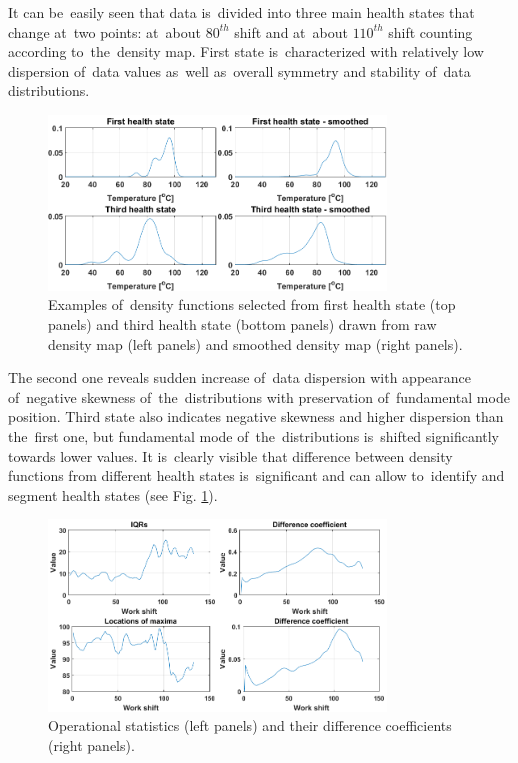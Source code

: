 It can be~easily seen that data is~divided into three main health states that change at~two points: at~about $80^{th}$ shift and at~about $110^{th}$ shift counting according to~the~density map. First state is~characterized with relatively low dispersion of~data values as~well as~overall symmetry and stability of~data distributions. 

\begin{figure}[ht!]
\centering
\includegraphics[width = 0.8\textwidth]{wykresy/ks_ex.png}
\caption{Examples of~density functions selected from first health state (top panels) and third health state (bottom panels) drawn from raw density map (left panels) and smoothed density map (right panels).}
\label{fig: ks_ex}
\end{figure}

The second one reveals sudden increase of~data dispersion with appearance of~negative skewness of~the~distributions with preservation of~fundamental mode position. Third state also indicates negative skewness and higher dispersion than the~first one, but fundamental mode of~the~distributions is~shifted significantly towards lower values. It is~clearly visible that difference between density functions from different health states is~significant and can allow to~identify and segment health states (see Fig. \ref{fig: ks_ex}).

\begin{figure}[ht!]
\centering
\includegraphics[width = 0.8\textwidth]{wykresy/ks_stats.png}
\caption{Operational statistics (left panels) and their difference coefficients (right panels).}
\label{fig: ks_stats}
\end{figure}

